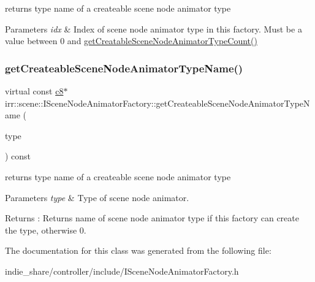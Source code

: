 returns type name of a createable scene node animator type 


\begin{DoxyParams}{Parameters}
{\em idx} & Index of scene node animator type in this factory. Must be a value between 0 and \hyperlink{classirr_1_1scene_1_1ISceneNodeAnimatorFactory_a7b6f10b1e602714652636763e8617691}{get\+Creatable\+Scene\+Node\+Animator\+Type\+Count()} \\
\hline
\end{DoxyParams}
\mbox{\label{classirr_1_1scene_1_1ISceneNodeAnimatorFactory_a905e896d9fbb0821dd4bf4214b786116}} 
\subsubsection{\texorpdfstring{get\+Createable\+Scene\+Node\+Animator\+Type\+Name()}{getCreateableSceneNodeAnimatorTypeName()}\hspace{0.1cm}{\footnotesize\ttfamily [2/2]}}
{\footnotesize\ttfamily virtual const \hyperlink{namespaceirr_a9395eaea339bcb546b319e9c96bf7410}{c8}$\ast$ irr\+::scene\+::\+I\+Scene\+Node\+Animator\+Factory\+::get\+Createable\+Scene\+Node\+Animator\+Type\+Name (\begin{DoxyParamCaption}\item[{\hyperlink{namespaceirr_1_1scene_a327a1e43872705cf8f3f3342fb307d19}{E\+S\+C\+E\+N\+E\+\_\+\+N\+O\+D\+E\+\_\+\+A\+N\+I\+M\+A\+T\+O\+R\+\_\+\+T\+Y\+PE}}]{type }\end{DoxyParamCaption}) const\hspace{0.3cm}{\ttfamily [pure virtual]}}



returns type name of a createable scene node animator type 


\begin{DoxyParams}{Parameters}
{\em type} & Type of scene node animator. \\
\hline
\end{DoxyParams}
\begin{DoxyReturn}{Returns}
\+: Returns name of scene node animator type if this factory can create the type, otherwise 0. 
\end{DoxyReturn}


The documentation for this class was generated from the following file\+:\begin{DoxyCompactItemize}
\item 
indie\+\_\+share/controller/include/I\+Scene\+Node\+Animator\+Factory.\+h\end{DoxyCompactItemize}
